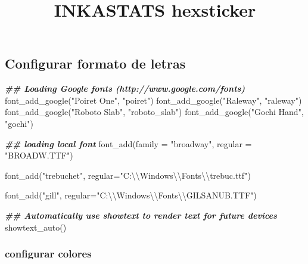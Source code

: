 \documentclass[
]{article}
\title{INKASTATS hexsticker}
\author{}
\date{\vspace{-2.5em}}
\newenvironment{Shaded}{\begin{snugshade}}{\end{snugshade}}
\newcommand{\AttributeTok}[1]{\textcolor[rgb]{0.77,0.63,0.00}{#1}}
\newcommand{\DocumentationTok}[1]{\textcolor[rgb]{0.56,0.35,0.01}{\textbf{\textit{#1}}}}
\newcommand{\FunctionTok}[1]{\textcolor[rgb]{0.00,0.00,0.00}{#1}}
\newcommand{\NormalTok}[1]{#1}
\newcommand{\SpecialCharTok}[1]{\textcolor[rgb]{0.00,0.00,0.00}{#1}}
\newcommand{\StringTok}[1]{\textcolor[rgb]{0.31,0.60,0.02}{#1}}
\begin{document}
\maketitle

\hypertarget{configurar-formato-de-letras}{%
\subsection{Configurar formato de
letras}\label{configurar-formato-de-letras}}

\begin{Shaded}
\begin{Highlighting}[]
\DocumentationTok{\#\# Loading Google fonts (http://www.google.com/fonts)}
\FunctionTok{font\_add\_google}\NormalTok{(}\StringTok{"Poiret One"}\NormalTok{, }\StringTok{"poiret"}\NormalTok{)}
\FunctionTok{font\_add\_google}\NormalTok{(}\StringTok{"Raleway"}\NormalTok{, }\StringTok{"raleway"}\NormalTok{)}
\FunctionTok{font\_add\_google}\NormalTok{(}\StringTok{"Roboto Slab"}\NormalTok{, }\StringTok{"roboto\_slab"}\NormalTok{)}
\FunctionTok{font\_add\_google}\NormalTok{(}\StringTok{"Gochi Hand"}\NormalTok{, }\StringTok{"gochi"}\NormalTok{)}

\DocumentationTok{\#\# loading local font }
\FunctionTok{font\_add}\NormalTok{(}\AttributeTok{family =} \StringTok{"broadway"}\NormalTok{, }\AttributeTok{regular =} \StringTok{"BROADW.TTF"}\NormalTok{)}

\FunctionTok{font\_add}\NormalTok{(}\StringTok{"trebuchet"}\NormalTok{,}
         \AttributeTok{regular=}\StringTok{"C:}\SpecialCharTok{\textbackslash{}\textbackslash{}}\StringTok{Windows}\SpecialCharTok{\textbackslash{}\textbackslash{}}\StringTok{Fonts}\SpecialCharTok{\textbackslash{}\textbackslash{}}\StringTok{trebuc.ttf"}\NormalTok{)}

\FunctionTok{font\_add}\NormalTok{(}\StringTok{"gill"}\NormalTok{,}
         \AttributeTok{regular=}\StringTok{"C:}\SpecialCharTok{\textbackslash{}\textbackslash{}}\StringTok{Windows}\SpecialCharTok{\textbackslash{}\textbackslash{}}\StringTok{Fonts}\SpecialCharTok{\textbackslash{}\textbackslash{}}\StringTok{GILSANUB.TTF"}\NormalTok{)}

\DocumentationTok{\#\# Automatically use showtext to render text for future devices}
\FunctionTok{showtext\_auto}\NormalTok{()}
\end{Highlighting}
\end{Shaded}

\hypertarget{configurar-colores}{%
\subsubsection{configurar colores}\label{configurar-colores}}
\end{document}
